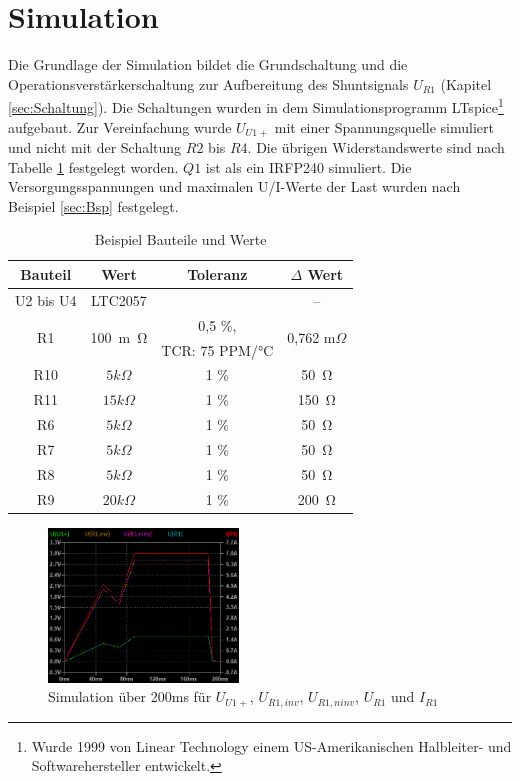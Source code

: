 \section{Simulation}

Die Grundlage der Simulation bildet die Grundschaltung und die Operationsverstärkerschaltung zur Aufbereitung des Shuntsignals $U_{R1}$ 
(Kapitel \ref{sec:Schaltung}). 
Die Schaltungen wurden in dem Simulationsprogramm LTspice\footnote{Wurde 1999 von Linear Technology einem 
US-Amerikanischen Halbleiter- und Softwarehersteller entwickelt.} aufgebaut. 
Zur Vereinfachung wurde $U_{U1+}$ mit einer Spannungsquelle simuliert und nicht mit der Schaltung $R2$ bis $R4$.
Die übrigen Widerstandswerte sind nach Tabelle \ref{tab:Werte_Fehler_Beispiel} festgelegt worden.
$Q1$ ist als ein IRFP240 \cite{IRFP250} simuliert.
Die Versorgungsspannungen und maximalen U/I-Werte der Last wurden nach Beispiel \ref{sec:Bsp} festgelegt.\\

\begin{table}[h!]
	\centering
	\caption{Beispiel Bauteile und Werte}
	\label{tab:Werte_Fehler_Beispiel}
	\normalsize
	\begin{tabular}{c|c|cc}
		Bauteil & Wert & Toleranz & $\Delta$ Wert\\
		\hline
		U2 bis U4 & LTC2057 & \cite{LTC2057} & --\\
		\multirow{2}{*}{R1}  & \multirow{2}{*}{\SI{100}{m\ohm}} & 0,5 \%,  & \multirow{2}{*}{0,762 m$\Omega$}\\
		&& TCR: 75 PPM/°C &\\
		R10 & $5 k\Omega$ & 1 \% & \SI{50}{\ohm} \\
		R11 & $15 k\Omega$ & 1 \%& \SI{150}{\ohm}\\
		R6  & $5 k\Omega$ & 1 \% & \SI{50}{\ohm} \\
		R7	& $5 k\Omega$ & 1 \% & \SI{50}{\ohm} \\
		R8  & $5 k\Omega$ & 1 \% & \SI{50}{\ohm} \\
		R9  & $20 k\Omega$ & 1 \%& \SI{200}{\ohm}\\
	\end{tabular}
\end{table}

\begin{figure}[!h]
	\centering
	\includegraphics[width=0.45\textwidth]{Bilder/Simu_Kleinsignale.png}
	\renewcommand*\figurename{Diagramm}
	\caption{Simulation über 200ms für $U_{U1+}$, $U_{R1,inv}$, $U_{R1,ninv}$, $U_{R1}$ und $I_{R1}$}
	\label{simu:Kleinsignale}
\end{figure}

